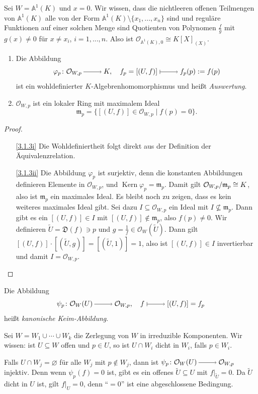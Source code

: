 \documentclass[a4paper,12pt]{scrbook}
\theoremstyle{keinenummern} %
\theoremstyle{mitnummern}
\theoremstyle{unserbeweis}
\newtheorem{proof}{Beweis}
\def\A{\mathbb{A}}
\def\O{\mathcal{O}}
\newcommand{\D}{\mathfrak{D}}
\def\m{\mathfrak{m}}
\newcommand{\Kern}{\operatorname{Kern}}
\renewcommand{\phi}{\varphi}
\newcommand{\leer}{\ensuremath{\varnothing}}
\newcommand{\restrict}[1]{|_{#1}}
\renewcommand{\dotsc}{\ensuremath{\!...}}
\newcommand{\ra}{\raisebox{-1pt}{\tikz{\draw[thin,shorten >=3pt, ->] (0,0) node{\hspace*{-2pt}} -- node{} (1,0);}}\penalty1000\relax}
\renewcommand{\mapsto}{\raisebox{-1pt}{\tikz{\draw[thin,shorten >=3pt, |->] (0,0) node{\hspace*{0pt}} -- node{} (1,0);}}\penalty1000\relax}
\newcommand{\Quotient}[2]{
  \mathchoice
  { %
    \raisebox{0.7ex}{\ensuremath{#1}}
    \ensuremath{\mkern-3mu}\big/\ensuremath{\mkern-3mu}
    \raisebox{-0.6ex}{\ensuremath{#2}}
  }
  { %
    #1/#2
  }
  { %
    #1/#2
  }
  { %
    #1/#2
  }
}
\begin{document}
\begin{bsp}\label{3.1.2}
  Sei $W=\A^1(K)$ und $x=0$. Wir wissen, dass die nichtleeren offenen Teilmengen von $\A^1(K)$ alle von der Form
  $\A^1(K)\setminus\{x_1,\dotsc,x_n\}$ sind und reguläre Funktionen auf einer solchen Menge sind Quotienten von Polynomen
  $\frac{f}{g}$ mit $g(x)\neq0$ für $x\neq x_i$, $i=1,\dotsc,n$. Also ist $\O_{\A^1(K),0}\cong K[X]_{(X)}$.
\end{bsp}

\begin{bem}\label{3.1.3}
  \begin{enumerate}
  \item{} Die Abbildung \[ \phi_{p}\colon \O_{W,p}\ra K,\quad f_p=[(U,f)]\mapsto f_p(p):=f(p) \]
    ist ein wohldefinierter $K$-Algebrenhomomorphismus und heißt \emph{Auswertung}.
  \item{} $\O_{W,p}$ ist ein lokaler Ring mit maximalem Ideal \[ \m_p = \{ [(U,f)]\in\O_{W,p}\mid f(p)=0\}. \]
  \end{enumerate}
\end{bem}
\begin{proof}
  \begin{enumerate}
  \item[\ref{3.1.3i}] Die Wohldefiniertheit folgt direkt aus der Definition der Äquivalenzrelation.
  \item[\ref{3.1.3ii}] Die Abbildung $\phi_p$ ist surjektiv, denn die konstanten Abbildungen definieren Elemente in $\O_{W,p}$,
    und $\Kern \phi_p=\m_p$. Damit gilt $\Quotient{\O_{W,p}}{\m_p}\cong K$, also ist $\m_p$ ein maximales Ideal. Es bleibt noch zu
    zeigen, dass es kein weiteres maximales Ideal gibt. Sei dazu $I\subseteq\O_{W,p}$ ein Ideal mit $I\not\subseteq \m_p$. Dann
    gibt es ein $[(U,f)]\in I$ mit $[(U,f)]\notin \m_p$, also $f(p)\neq0$. Wir definieren $\tilde{U}=\D(f)\ni p$ und
    $g=\frac1f\in\O_W(\tilde{U})$. Dann gilt $[(U,f)]\cdot[(\tilde{U},g)]=[(\tilde{U},1)]=1$, also ist $[(U,f)]\in I$
    invertierbar und damit $I=\O_{W,p}$.
  \end{enumerate}
\end{proof}

\begin{bem}\label{3.1.4}
  Die Abbildung \[ \psi_p\colon \O_W(U)\ra\O_{W,p},\quad f\mapsto[(U,f)]=f_p \] heißt \emph{kanonische Keim-Abbildung}.

  Sei $W=W_1\cup\dotsm\cup W_k$ die Zerlegung von $W$ in irreduzible Komponenten. Wir wissen: ist $U\subseteq W$ offen und $p\in
  U$, so ist $U\cap W_i$ dicht in $W_i$, falls $p\in W_i$.

  Falls $U\cap W_j=\leer$ für alle $W_j$ mit $p\notin W_j$, dann ist $\psi_p\colon\O_W(U)\ra\O_{W,p}$ injektiv. Denn wenn
  $\psi_p(f)=0$ ist, gibt es ein offenes $\tilde{U}\subseteq U$ mit $f\restrict{\tilde{U}}=0$. Da $\tilde{U}$ dicht in $U$ ist,
  gilt $f\restrict{U}=0$, denn \enquote{$=0$} ist eine abgeschlossene Bedingung.
\end{bem}
\end{document}
